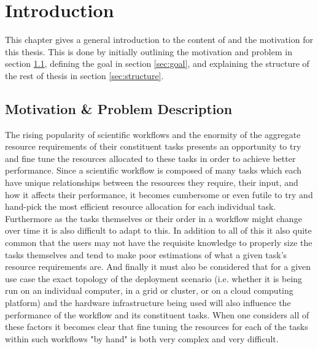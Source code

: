 
\cleardoublepage
\chapter{Introduction}
\label{cha:introduction}

This chapter gives a general introduction to the content of and the motivation for this thesis. This is done by initially outlining the motivation and problem in section \ref{sec:motivation}, defining the goal in section \ref{sec:goal}, and explaining the structure of the rest of thesis in section \ref{sec:structure}.

\section{Motivation \& Problem Description}
\label{sec:motivation}


The rising popularity of scientific workflows and the enormity of the aggregate resource requirements of their constituent tasks \cite{ResourceProvisioning} presents an opportunity to try and fine tune the resources allocated to these tasks in order to achieve better performance. Since a scientific workflow is composed of many tasks which each have unique relationships between the resources they require, their input, and how it affects their performance, it becomes cumbersome or even futile to try and hand-pick the most efficient resource allocation for each individual task. Furthermore as the tasks themselves or their order in a workflow might change over time it is also difficult to adapt to this. In addition to all of this it also quite common that the users may not have the requisite knowledge to properly size the tasks themselves and tend to make poor estimations \cite{Predictability} of what a given task's resource requirements are. And finally it must also be considered that for a given use case the exact topology of the deployment scenario (i.e. whether it is being run on an individual computer, in a grid or cluster, or on a cloud computing platform) and the hardware infrastructure being used will also influence the performance of the workflow and its constituent tasks.  When one considers all of these factors it becomes clear that fine tuning the resources for each of the tasks within such workflows "by hand" is both very complex and very difficult. 

